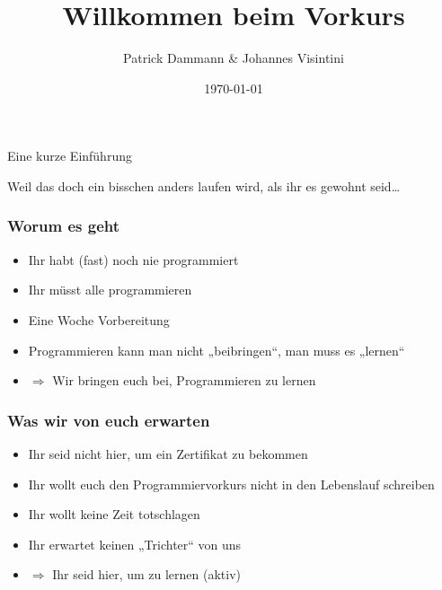 \documentclass{beamer}
\newcommand{\Ra}{\Rightarrow}
\begin{document}
\title{Willkommen beim Vorkurs}
\author{Patrick Dammann \& Johannes Visintini}
\date{\today}

\begin{frame}
\titlepage
\end{frame}

\begin{frame}
    \begin{center}
        \Huge Eine kurze Einführung
    \end{center}
    \begin{center}
        \pause\Huge Weil das doch ein bisschen anders laufen wird, als ihr es gewohnt seid\dots
    \end{center}
\end{frame}

\begin{frame}
    \frametitle{Worum es geht}
    \begin{itemize}
        \item Ihr habt (fast) noch nie programmiert
        \pause\item Ihr müsst alle programmieren
        \pause\item Eine Woche Vorbereitung
        \pause\item Programmieren kann man nicht „beibringen“, man muss es „lernen“
        \pause\item $\Ra$ Wir bringen euch bei, Programmieren zu lernen
    \end{itemize}
\end{frame}

\begin{frame}
    \frametitle{Was wir von euch erwarten}
    \begin{itemize}
        \item Ihr seid nicht hier, um ein Zertifikat zu bekommen
        \pause\item Ihr wollt euch den Programmiervorkurs nicht in den Lebenslauf schreiben
        \pause\item Ihr wollt keine Zeit totschlagen
        \pause\item Ihr erwartet keinen „Trichter“ von uns
        \pause\item $\Ra$ Ihr seid hier, um zu lernen (aktiv)
    \end{itemize}
\end{frame}
\end{document}
